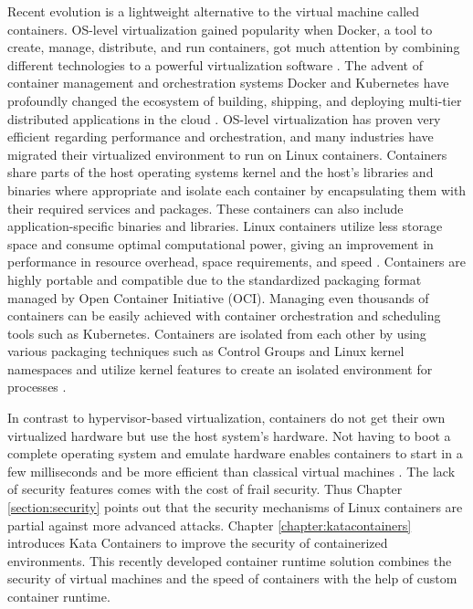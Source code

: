 Recent evolution is a lightweight alternative to the virtual machine called containers. OS-level virtualization gained popularity when Docker, a tool to create, manage, distribute, and run containers, got much attention by combining different technologies to a powerful virtualization software \cite{Eder2016}. The advent of container management and orchestration systems Docker and Kubernetes have profoundly changed the ecosystem of building, shipping, and deploying multi-tier distributed applications in the cloud \cite{Gao2017}. OS-level virtualization has proven very efficient regarding performance and orchestration, and many industries have migrated their virtualized environment to run on Linux containers. Containers share parts of the host operating systems kernel and the host's libraries and binaries where appropriate and isolate each container by encapsulating them with their required services and packages. These containers can also include application-specific binaries and libraries. Linux containers utilize less storage space and consume optimal computational power, giving an improvement in performance in resource overhead, space requirements, and speed \cite{Lingayat2018}\cite{Toimela2017}. Containers are highly portable and compatible due to the standardized packaging format managed by Open Container Initiative (OCI)\cite{OCI}. Managing even thousands of containers can be easily achieved with container orchestration and scheduling tools such as Kubernetes. Containers are isolated from each other by using various packaging techniques such as Control Groups and Linux kernel namespaces and utilize kernel features to create an isolated environment for processes \cite{Flauzac2020}.

In contrast to hypervisor-based virtualization, containers do not get their own virtualized hardware but use the host system's hardware. Not having to boot a complete operating system and emulate hardware enables containers to start in a few milliseconds and be more efficient than classical virtual machines \cite{Eder2016}. The lack of security features comes with the cost of frail security. Thus Chapter \ref{section:security} points out that the security mechanisms of Linux containers are partial against more advanced attacks. Chapter \ref{chapter:katacontainers} introduces Kata Containers to improve the security of containerized environments. This recently developed container runtime solution combines the security of virtual machines and the speed of containers with the help of custom container runtime.

